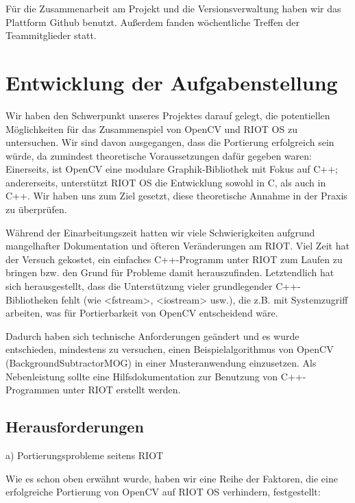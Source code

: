 \documentclass[10pt,a4paper]{article}
\begin{document}
Für die Zusammenarbeit am Projekt und die Versionsverwaltung haben wir das Plattform Github benutzt. Außerdem fanden wöchentliche Treffen der Teammitglieder statt. \\


\newpage
\section{Entwicklung der Aufgabenstellung}

Wir haben den Schwerpunkt unseres Projektes darauf gelegt, die potentiellen Möglichkeiten für das Zusammenspiel von OpenCV und RIOT OS zu untersuchen. Wir sind davon ausgegangen, dass die Portierung erfolgreich sein würde, da zumindest theoretische Voraussetzungen dafür gegeben waren: Einerseits, ist OpenCV eine modulare Graphik-Bibliothek mit Fokus auf C++; andererseits, unterstützt RIOT OS die Entwicklung sowohl in C, als auch in C++. Wir haben uns zum Ziel gesetzt, diese theoretische Annahme in der Praxis zu überprüfen. \newline

Während der Einarbeitungszeit hatten wir viele Schwierigkeiten aufgrund mangelhafter Dokumentation und öfteren Veränderungen am RIOT. Viel Zeit hat der Versuch gekostet, ein einfaches C++-Programm unter RIOT zum Laufen zu bringen bzw. den Grund für Probleme damit herauszufinden. Letztendlich hat sich herausgestellt, dass die Unterstützung vieler grundlegender C++-Bibliotheken fehlt (wie <fstream>, <iostream> usw.), die z.B. mit Systemzugriff arbeiten, was für Portierbarkeit von OpenCV entscheidend wäre. \newline

Dadurch haben sich technische Anforderungen geändert und es wurde entschieden, mindestens zu versuchen, einen Beispielalgorithmus von OpenCV (BackgroundSubtractorMOG) in einer Musteranwendung einzusetzen. Als Nebenleistung sollte eine Hilfsdokumentation zur Benutzung von C++-Programmen unter RIOT erstellt werden.

\subsection{Herausforderungen}

a) Portierungsprobleme seitens RIOT \newline

Wie es schon oben erwähnt wurde, haben wir eine Reihe der Faktoren, die eine erfolgreiche Portierung von OpenCV auf RIOT OS verhindern, festgestellt:
\end{document}
